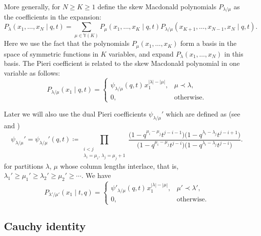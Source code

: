 \documentclass[pdftex]{sigma}
\numberwithin{equation}{section}
\begin{document}
More generally, for $N\ge K\ge1$
define the skew Macdonald polynomials
$P_{\lambda/\mu}$
as the coefficients
in the expansion:
\begin{equation*}
	P_\lambda(x_1,\dots,x_N \mid q,t)=
	\sum_{\mu\in \mathbb{Y}(K)}
	P_\mu(x_1,\dots,x_K \mid q,t )
	P_{\lambda/\mu}(x_{K+1},\dots,x_{N-1},x_N \mid q,t ).
\end{equation*}
Here we use the fact that
the polynomials
$P_\mu(x_1,\dots,x_K )$
form a basis in the space of symmetric functions in $K$ variables, and
expand
$P_\lambda(x_1,\dots,x_N )$
in this basis.
The Pieri coefficient is related to the skew Macdonald polynomial
in one variable as follows:
\begin{equation*}%
	P_{\lambda/\mu}(x_1\mid q,t)=
	\begin{cases}
		\psi_{\lambda/\mu}(q,t)\hspace{1pt} x_1^{|\lambda|-|\mu|},&\mu\prec \lambda,\\
		0,&\text{otherwise}.
	\end{cases}
\end{equation*}

Later we will also use the dual Pieri coefficients
$\psi_{\lambda/\mu}'$ which are defined as
(see \cite[formula~(VI.6.24.iv)]{Macdonald1995} and
\cite[formula~(2.12)]{BorodinCorwin2011Macdonald})
\begin{equation}
	\label{eq:psi_prime_Pieri}
	\psi_{\lambda/\mu}'=
	\psi_{\lambda/\mu}'(q,t)
	\coloneqq
	\prod_{\substack{i<j \\ \lambda_{i}=\mu_{i},\, \lambda_{j}=\mu_{j}+1}}
	\frac{\big(1-q^{\mu_{i}-\mu_{j}} t^{j-i-1}\big)\big(1-q^{\lambda_{i}-\lambda_{j}} t^{j-i+1}\big)}
	{\big(1-q^{\mu_{i}-\mu_{j}} t^{j-i}\big)\big(1-q^{\lambda_{i}-\lambda_{j}} t^{j-i}\big)}.
\end{equation}
for partitions $\lambda$, $\mu$ whose column lengths interlace,
that is,
$\lambda_1'\ge \mu_1'\ge \lambda_2'\ge \mu_2'\ge \cdots $.
We have
\begin{equation}
	\label{eq:P_skew_single_variable_dual}
	P_{\lambda'/\mu'}(x_1 \mid t,q)=
	\begin{cases}
		\psi'_{\lambda/\mu}(q,t)\hspace{1pt} x_1^{|\lambda|-|\mu|}
		,&\mu'\prec \lambda',\\
		0
		,&\text{otherwise}.
	\end{cases}
\end{equation}

\subsection{Cauchy identity}\label{sub:Cauchy_and_Dyson1}
\end{document}
